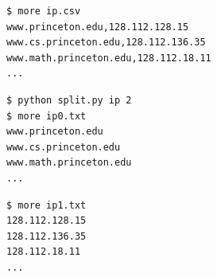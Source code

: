 \documentclass[8pt,a4paper,compress]{beamer}
\begin{document}
\begin{frame}[fragile]
\pause

\begin{lstlisting}[language={}]
$ more ip.csv 
www.princeton.edu,128.112.128.15
www.cs.princeton.edu,128.112.136.35
www.math.princeton.edu,128.112.18.11
...
\end{lstlisting}

\pause

\begin{lstlisting}[language={}]
$ python split.py ip 2
$ more ip0.txt
www.princeton.edu
www.cs.princeton.edu
www.math.princeton.edu
...
\end{lstlisting}

\pause

\begin{lstlisting}[language={}]
$ more ip1.txt
128.112.128.15
128.112.136.35
128.112.18.11
...
\end{lstlisting}
\end{frame}
\end{document}
